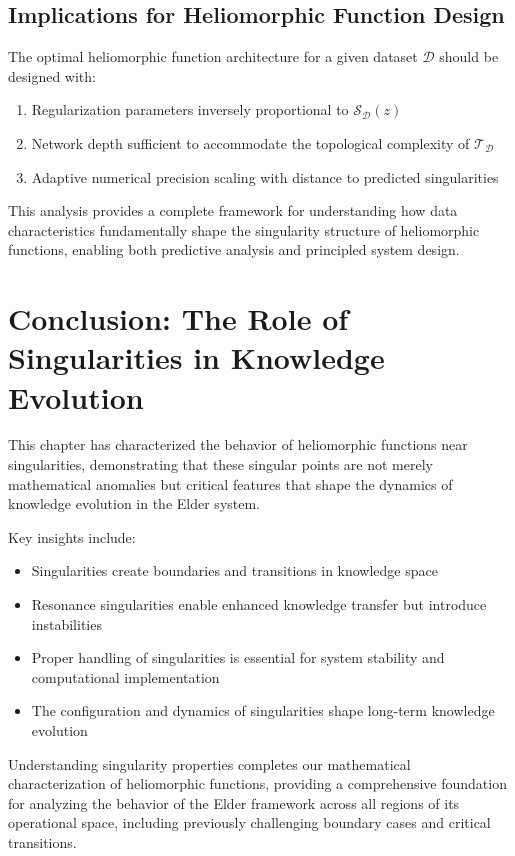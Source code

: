 \subsection{Implications for Heliomorphic Function Design}

\begin{corollary}
The optimal heliomorphic function architecture for a given dataset $\mathcal{D}$ should be designed with:
\begin{enumerate}
\item Regularization parameters inversely proportional to $\mathcal{S}_{\mathcal{D}}(z)$
\item Network depth sufficient to accommodate the topological complexity of $\mathcal{T}_{\mathcal{D}}$
\item Adaptive numerical precision scaling with distance to predicted singularities
\end{enumerate}
\end{corollary}

This analysis provides a complete framework for understanding how data characteristics fundamentally shape the singularity structure of heliomorphic functions, enabling both predictive analysis and principled system design.

\section{Conclusion: The Role of Singularities in Knowledge Evolution}

This chapter has characterized the behavior of heliomorphic functions near singularities, demonstrating that these singular points are not merely mathematical anomalies but critical features that shape the dynamics of knowledge evolution in the Elder system.

Key insights include:
\begin{itemize}
    \item Singularities create boundaries and transitions in knowledge space
    \item Resonance singularities enable enhanced knowledge transfer but introduce instabilities
    \item Proper handling of singularities is essential for system stability and computational implementation
    \item The configuration and dynamics of singularities shape long-term knowledge evolution
\end{itemize}

Understanding singularity properties completes our mathematical characterization of heliomorphic functions, providing a comprehensive foundation for analyzing the behavior of the Elder framework across all regions of its operational space, including previously challenging boundary cases and critical transitions.